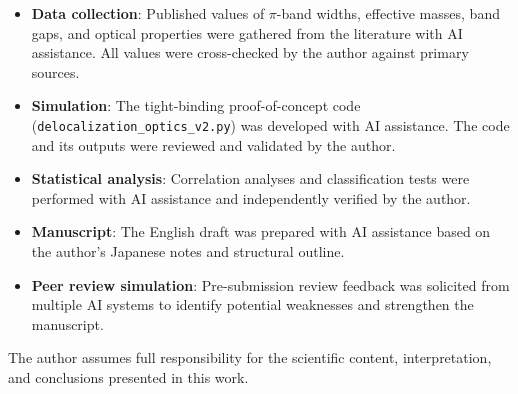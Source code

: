 \documentclass[twocolumn,showpacs,preprintnumbers,amsmath,amssymb,prb]{revtex4-2}
\begin{document}
\begin{itemize}
  \item \textbf{Data collection}: Published values of $\pi$-band
    widths, effective masses, band gaps, and optical properties were
    gathered from the literature with AI assistance. All values were
    cross-checked by the author against primary sources.
  \item \textbf{Simulation}: The tight-binding proof-of-concept code
    (\texttt{delocalization\_optics\_v2.py}) was developed with AI
    assistance. The code and its outputs were reviewed and validated
    by the author.
  \item \textbf{Statistical analysis}: Correlation analyses and
    classification tests were performed with AI assistance and
    independently verified by the author.
  \item \textbf{Manuscript}: The English draft was prepared with AI
    assistance based on the author's Japanese notes and structural
    outline.
  \item \textbf{Peer review simulation}: Pre-submission review
    feedback was solicited from multiple AI systems to identify
    potential weaknesses and strengthen the manuscript.
\end{itemize}

\noindent The author assumes full responsibility for the scientific
content, interpretation, and conclusions presented in this work.


\end{document}
